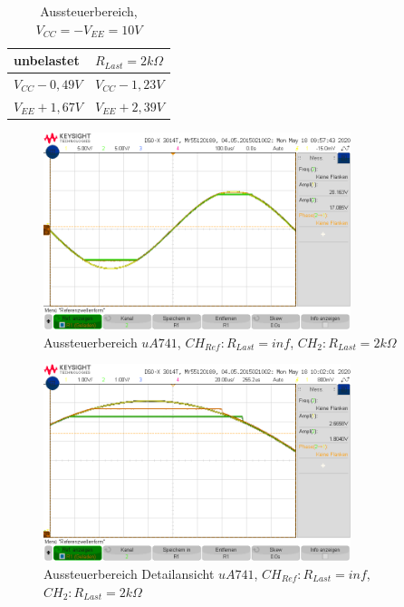 \begin{table}[H]
\centering
\caption{Aussteuerbereich,  $V_{CC}=-V_{EE}=10V$}
\label{tab:Clip_Folger_ua741}
\begin{tabular}{|l|l|}
\hline
unbelastet       & $R_{Last} = 2k\Omega$ \\ \hline
$V_{CC} - 0,49V$ & $V_{CC} - 1,23V$      \\ \hline
$V_{EE} + 1,67V$ & $V_{EE} + 2,39V$      \\ \hline
\end{tabular}
\end{table}

\begin{figure}[H]
    \centering
    \includegraphics[width=0.8\textwidth]{Lab_1/Messungen/Folger/uberst-schw3.png}
    \caption{Aussteuerbereich $uA741$, $CH_{Ref}: R_{Last} = inf$, $CH_{2}: R_{Last} = 2k\Omega$}
    \label{fig:my_label}
\end{figure}
\begin{figure}[H]
    \centering
    \includegraphics[width=0.8\textwidth]{Lab_1/Messungen/Folger/uberst-schw5.png}
    \caption{Aussteuerbereich Detailansicht $uA741$, $CH_{Ref}: R_{Last} = inf$, $CH_{2}: R_{Last} = 2k\Omega$}
    \label{fig:my_label}
\end{figure}

